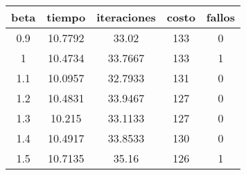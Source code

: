 \begin{table}[h!]
\centering
\begin{tabular}{ccccc}
beta & tiempo & iteraciones & costo & fallos \\ 
\hline 
0.9 & 10.7792 & 33.02 & 133 & 0 \\ 
1 & 10.4734 & 33.7667 & 133 & 1 \\ 
1.1 & 10.0957 & 32.7933 & 131 & 0 \\ 
1.2 & 10.4831 & 33.9467 & 127 & 0 \\ 
1.3 & 10.215 & 33.1133 & 127 & 0 \\ 
1.4 & 10.4917 & 33.8533 & 130 & 0 \\ 
1.5 & 10.7135 & 35.16 & 126 & 1 \\ 
\hline 
\end{tabular}
\end{table}